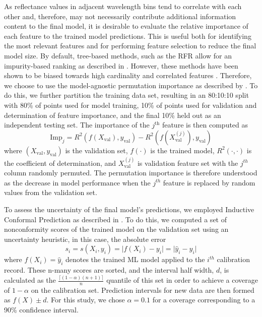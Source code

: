 \documentclass[remotesensing,article,submit,pdftex,moreauthors]{Definitions/mdpi}
\begin{document}
As reflectance values in adjacent wavelength bins tend to correlate with each other and, therefore, may not necessarily contribute additional information content to the final model, it is desirable to evaluate the relative importance of each feature to the trained model predictions. This is useful both for identifying the most relevant features and for performing feature selection to reduce the final model size. By default, tree-based methods, such as the RFR allow for an impurity-based ranking as described in \cite{random-forest, rfr-importance-ranking}. However, these methods have been shown to be biased towards high cardinality and correlated features \cite{strobl2008conditional}. Therefore, we choose to use the model-agnostic permutation importance as described by \cite{parr2018beware}. To do this, we further partition the training data set, resulting in an 80:10:10 split with 80\% of points used for model training, 10\% of points used for validation and determination of feature importance, and the final 10\% held out as an independent testing set. The importance of the $j^{\text{th}}$ feature is then computed as
\begin{equation}
    \text{Imp}_j = R^2(f(X_{\text{val}}), y_{\text{val}}) - R^2(f(X_{\text{val}}^{(j)}), y_{\text{val}})
\end{equation}
where $(X_{\text{val}}, y_{\text{val}})$ is the validation set, $f(\cdot)$ is the trained model, $R^2(\cdot, \cdot)$ is the coefficient of determination, and $X_{\text{val}}^{(j)}$ is validation feature set with the $j^{th}$ column randomly permuted. The permutation importance is therefore understood as the decrease in model performance when the $j^{th}$ feature is replaced by random values from the validation set.

To assess the uncertainty of the final model's predictions, we employed Inductive Conformal Prediction as described in \cite{conformal-prediction-1, conformal-prediction-2, conformal-prediction-3, conformal-prediction-4}. To do this, we computed a set of nonconformity scores of the trained model on the validation set using an uncertainty heuristic, in this case, the absolute error
\begin{equation}
    s_i = s(X_i, y_i) = \lvert f(X_i) - y_i \rvert = \lvert \hat{y}_i - y_i \rvert
\end{equation}
where $f(X_i)=\hat{y}_i$ denotes the trained ML model applied to the $i^{th}$ calibration record. These n-many scores are sorted, and the interval half width, $d$, is calculated as the $\frac{\lceil(1-\alpha)(n+1) \rceil}{n}$ quantile of this set in order to achieve a coverage of $1-\alpha$ on the calibration set. Prediction intervals for new data are then formed as $f(X)\pm d$. For this study, we chose $\alpha=0.1$ for a coverage corresponding to a 90\% confidence interval.
\end{document}
